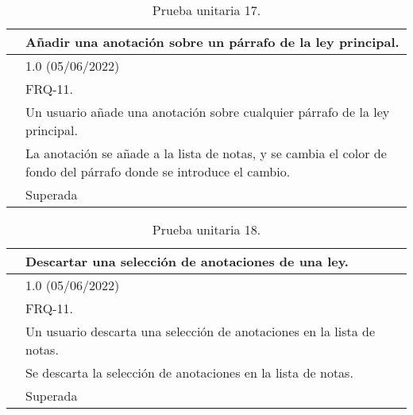 \begin{table}[H]
\begin{center}
\begin{tabular}{|p{3cm}|p{10cm}|} \hline
\centering {\bf PU-17} & Añadir una anotación sobre un párrafo de la ley principal.  \\ \hline\hline
\centering {\bf Versión} & 1.0 (05/06/2022) \\ \hline
\centering {\bf Dependencias} & FRQ-11. \\ \hline
\centering {\bf Descripción} &  Un usuario añade una anotación sobre cualquier párrafo de la ley principal. \\ \hline
\centering {\bf Criterio de aceptación} & La anotación se añade a la lista de notas, y se cambia el color de fondo del párrafo donde se introduce el cambio. \\ \hline
\centering {\bf Estado} & Superada \\ \hline
\end{tabular}
\caption{Prueba unitaria 17.}
\label{enlacePU17}
\end{center}
\end{table}

\begin{table}[H]
\begin{center}
\begin{tabular}{|p{3cm}|p{10cm}|} \hline
\centering {\bf PU-18} & Descartar una selección de anotaciones de una ley.  \\ \hline\hline
\centering {\bf Versión} & 1.0 (05/06/2022) \\ \hline
\centering {\bf Dependencias} & FRQ-11. \\ \hline
\centering {\bf Descripción} &  Un usuario descarta una selección de anotaciones en la lista de notas. \\ \hline
\centering {\bf Criterio de aceptación} & Se descarta la selección de anotaciones en la lista de notas. \\ \hline
\centering {\bf Estado} & Superada \\ \hline
\end{tabular}
\caption{Prueba unitaria 18.}
\label{enlacePU18}
\end{center}
\end{table}

